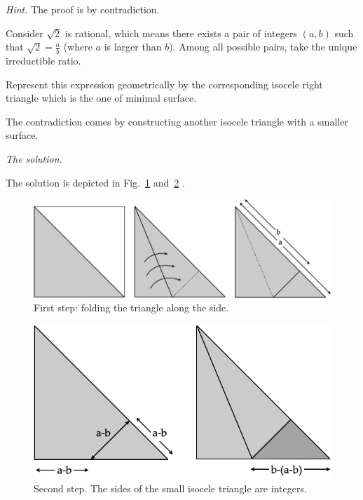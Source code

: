 \noindent \textit{Hint.}
The proof is by contradiction. 

Consider $\sqrt{2}$ is rational, which means there exists a pair of integers $(a,b)$
such that $\sqrt{2} = \frac{a}{b}$ (where $a$ is larger than $b$).
Among all possible pairs, take the unique irreductible ratio.

Represent this expression geometrically by the corresponding isocele right triangle
which is the one of minimal surface. 

The contradiction comes by constructing another isocele triangle with a smaller surface.
\medskip

\noindent \textit{The solution.}

The solution is depicted in Fig.~\ref{Fig:sqrtbisInit} and~\ref{Fig:sqrtbisFin} . 
\begin{figure}
\begin{center}
        \includegraphics[scale=0.3]{FiguresArithmetic/sqrtbisInit}
        \caption{First step: folding the triangle along the side.}
        \label{Fig:sqrtbisInit}
\end{center}
\end{figure}
\begin{figure}
\begin{center}
        \includegraphics[scale=0.3]{FiguresArithmetic/sqrtbisFin}
        \caption{Second step. The sides of the small isocele triangle are integers.}
        \label{Fig:sqrtbisFin}
\end{center}
\end{figure}



